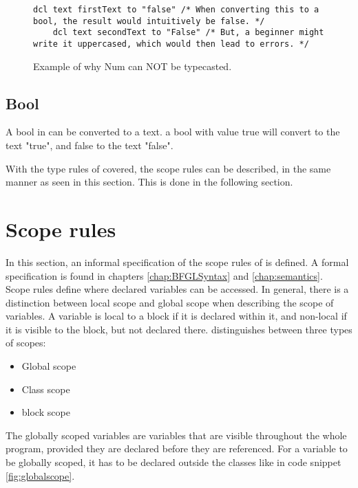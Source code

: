 \begin{figure}[H]
    \centering
    \begin{lstlisting}[style=gglang]
    dcl text firstText to "false" /* When converting this to a bool, the result would intuitively be false. */
    dcl text secondText to "False" /* But, a beginner might write it uppercased, which would then lead to errors. */
    \end{lstlisting}
    \caption{Example of why Num can NOT be typecasted.}
    \label{fig:stringconversions}
\end{figure}

\subsection{Bool}
A bool in \lang{} can be converted to a text. a bool with value true will convert to the text "true", and false to the text "false". 

With the type rules of \lang{} covered, the scope rules can be described, in the same manner as seen in this section. This is done in the following section.

\section{Scope rules}
In this section, an informal specification of the scope rules of \lang{} is defined. A formal specification is found in chapters \ref{chap:BFGLSyntax} and \ref{chap:semantics}.\\

Scope rules define where declared variables can be accessed. In general, there is a distinction between local scope and global scope when describing the scope of variables. A variable is local to a block if it is declared within it, and non-local if it is visible to the block, but not declared there. \lang{} distinguishes between three types of scopes:
\begin{itemize}
    \item Global scope
    \item Class scope
    \item block scope
\end{itemize}

The globally scoped variables are variables that are visible throughout the whole program, provided they are declared before they are referenced. For a variable to be globally scoped, it has to be declared outside the classes like in code snippet \ref{fig:globalscope}. 

